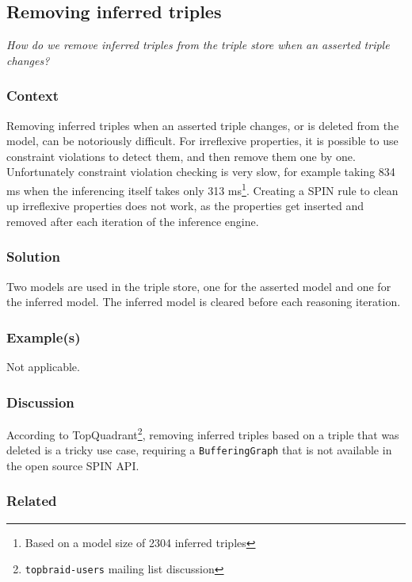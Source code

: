 \subsection{Removing inferred triples}

\emph{How do we remove inferred triples from the triple store when an asserted triple changes?}
\subsubsection{Context}

Removing inferred triples when an asserted triple changes, or is deleted from the model, can be notoriously difficult. For irreflexive properties, it is possible to use constraint violations to detect them, and then remove them one by one. Unfortunately constraint violation checking is very slow, for example taking 834 ms when the inferencing itself takes only 313 ms\footnote{Based on a model size of 2304 inferred triples}. Creating a \ac{SPIN} rule to clean up irreflexive properties does not work, as the properties get inserted and removed after each iteration of the inference engine. 

\subsubsection{Solution}

Two models are used in the triple store, one for the asserted model and one for the inferred model. The inferred model is cleared before each reasoning iteration.

\subsubsection{Example(s)}

Not applicable.

\subsubsection{Discussion}

According to TopQuadrant\footnote{\texttt{topbraid-users} mailing list discussion}, removing inferred triples based on a triple that was deleted is a tricky use case, requiring a \texttt{BufferingGraph} that is not available in the open source \ac{SPIN} \ac{API}.

\subsubsection{Related}

